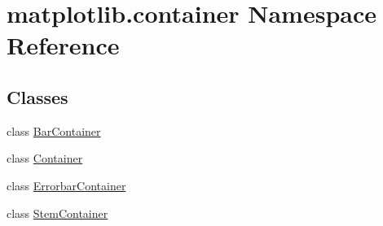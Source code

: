 \hypertarget{namespacematplotlib_1_1container}{}\section{matplotlib.\+container Namespace Reference}
\label{namespacematplotlib_1_1container}
\subsection*{Classes}
\begin{DoxyCompactItemize}
\item 
class \hyperlink{classmatplotlib_1_1container_1_1BarContainer}{Bar\+Container}
\item 
class \hyperlink{classmatplotlib_1_1container_1_1Container}{Container}
\item 
class \hyperlink{classmatplotlib_1_1container_1_1ErrorbarContainer}{Errorbar\+Container}
\item 
class \hyperlink{classmatplotlib_1_1container_1_1StemContainer}{Stem\+Container}
\end{DoxyCompactItemize}
